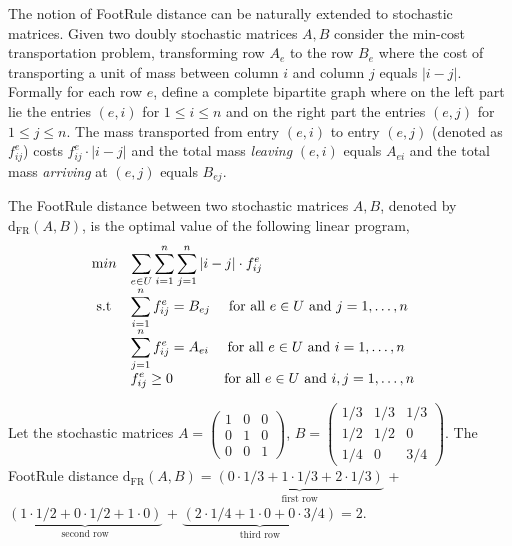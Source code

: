 \documentclass[a4paper,UKenglish,cleveref,autoref, thm-restate]{lipics-v2019}
\begin{document}
The notion of FootRule distance can be naturally extended to stochastic matrices. Given two doubly stochastic matrices $A,B$ consider the min-cost transportation problem, transforming row $A_e$ to the row $B_e$ where the cost of transporting a unit of mass between column $i$ and column $j$ equals $|i-j|$. Formally for each row $e$, define a complete bipartite graph where on the left part lie the entries $(e,i)$ for $1\leq i \leq n$ and on the right part the entries $(e,j)$ for $1\leq j \leq n$. The mass transported from entry $(e,i)$ to entry $(e,j)$ (denoted as $f_{ij}^e$)
costs $f_{ij}^e\cdot |i-j|$ and the total mass \textit{leaving} $(e,i)$ equals $A_{ei}$ and the total  mass \textit{arriving} at $(e,j)$ equals $B_{ej}$.
\begin{definition}\label{d:distance_lp}
The FootRule distance between two stochastic matrices 
$A,B$, denoted by $\mathrm{d}_{\mathrm{FR}}(A,B)$, is the optimal value of the following linear program,
\begin{equation*}
    \begin{array}{ll@{}ll}
        \text min & \displaystyle \sum_{e \in U} \sum_{i = 1}^{n} \sum_{j=1}^n |i - j| \cdot f_{ij}^e &\\
        \text{ s.t } & \displaystyle \sum_{i=1}^{n} f_{ij}^e = B_{ej}~~~~\text{for all }e \in U \text{ and }j=1,\ldots ,n&&\\
        & \displaystyle \sum_{j=1}^{n} f_{ij}^e = A_{ei}~~~~\text{for all }e \in U \text{ and }i=1,\ldots, n&&\\
        & \displaystyle f_{ij}^e \geq 0~~~~~~~~~~~\text{for all } e \in U \text{ and }i,j = 1,\ldots, n
    \end{array}
\end{equation*}
\end{definition}
\begin{example}
Let the stochastic matrices $A = 
\begin{pmatrix}
1 & 0 & 0 \\
0 & 1 & 0 \\
0 & 0 & 1
\end{pmatrix}$, $B = 
\begin{pmatrix}
1/3 & 1/3 & 1/3 \\
1/2 & 1/2 & 0 \\
1/4 & 0 & 3/4
\end{pmatrix}$. The FootRule distance $\mathrm{d}_{\mathrm{FR}}(A,B) = \underbrace{(0\cdot 1/3 + 1\cdot 1/3 + 2\cdot 1/3)}_{\text{first row}}$ + $\underbrace{(1\cdot 1/2 + 0\cdot 1/2 + 1\cdot 0)}_{\text{second row}}$
+ $\underbrace{(2\cdot 1/4 + 1\cdot 0 + 0\cdot 3/4)}_{\text{third row}} = 2$.
\end{example}
\end{document}
